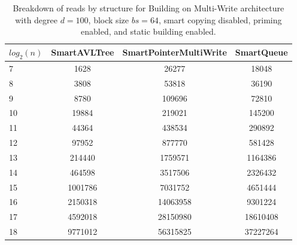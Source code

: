 \begin{table}[]
\centering
\begin{tabular}{|l|c|c|c|}
$log_2(n)$ & SmartAVLTree & SmartPointerMultiWrite & SmartQueue \\ \hline
7 & 1628 & 26277 & 18048 \\ \hline
8 & 3808 & 53818 & 36190 \\ \hline
9 & 8780 & 109696 & 72810 \\ \hline
10 & 19884 & 219021 & 145200 \\ \hline
11 & 44364 & 438534 & 290892 \\ \hline
12 & 97952 & 877770 & 581428 \\ \hline
13 & 214440 & 1759571 & 1164386 \\ \hline
14 & 464598 & 3517506 & 2326432 \\ \hline
15 & 1001786 & 7031752 & 4651444 \\ \hline
16 & 2150318 & 14063958 & 9301224 \\ \hline
17 & 4592018 & 28150980 & 18610408 \\ \hline
18 & 9771012 & 56315825 & 37227264 \\ \hline
\end{tabular}
\caption{Breakdown of reads by structure for Building on Multi-Write architecture with degree $d=100$, block size $bs=64$, smart copying disabled, priming enabled, and static building enabled.}
    \label{tab:reads_by_structure_build_d100_bs64_copiesfalse_primetrue_staticinsertiontrue_ptmultiwrite_movetrue}
\end{table}

